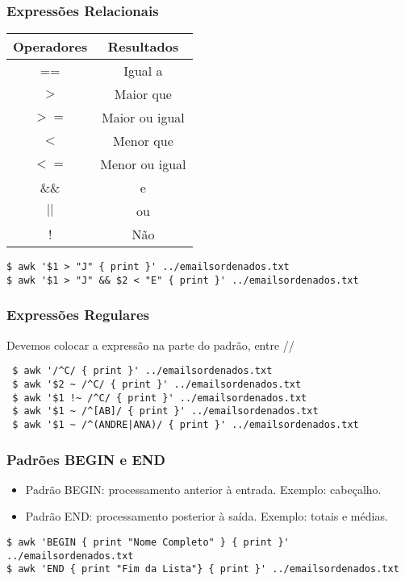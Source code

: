 \documentclass{beamer}
\begin{document}
   \begin{frame}[fragile]
      \frametitle{Expressões Relacionais}
      \begin{table}
         \begin{tabular}{c|c}
	 \textbf{Operadores} & \textbf{Resultados} \\
	 \hline
         ==   & Igual a \\
	 $>$  & Maior que \\
	 $>=$ & Maior ou igual \\
	 $<$  & Menor que \\
	 $<=$ & Menor ou igual \\
         \&\& & e \\
	 $||$ & ou \\
	 !    & Não \\
         \hline 
         \end{tabular}
      \end{table}
      \small
      \begin{verbatim}
$ awk '$1 > "J" { print }' ../emailsordenados.txt
$ awk '$1 > "J" && $2 < "E" { print }' ../emailsordenados.txt
      \end{verbatim}
\end{frame}

   \begin{frame}[fragile]
      \frametitle{Expressões Regulares}
      Devemos colocar a expressão na parte do padrão, entre \slash\slash \\
      \small
      \begin{verbatim}
 $ awk '/^C/ { print }' ../emailsordenados.txt
 $ awk '$2 ~ /^C/ { print }' ../emailsordenados.txt
 $ awk '$1 !~ /^C/ { print }' ../emailsordenados.txt
 $ awk '$1 ~ /^[AB]/ { print }' ../emailsordenados.txt
 $ awk '$1 ~ /^(ANDRE|ANA)/ { print }' ../emailsordenados.txt
      \end{verbatim}
\end{frame}

   \begin{frame}[fragile]
      \frametitle{Padrões BEGIN e END}
      \begin{itemize}
         \item Padrão BEGIN: processamento anterior à entrada. Exemplo: cabeçalho. 
         \item Padrão END: processamento posterior à saída. Exemplo: totais e médias. 
      \end{itemize}
      \scriptsize
      \begin{verbatim}
$ awk 'BEGIN { print "Nome Completo" } { print }' ../emailsordenados.txt
$ awk 'END { print "Fim da Lista"} { print }' ../emailsordenados.txt
      \end{verbatim}
\end{frame}
\end{document}
